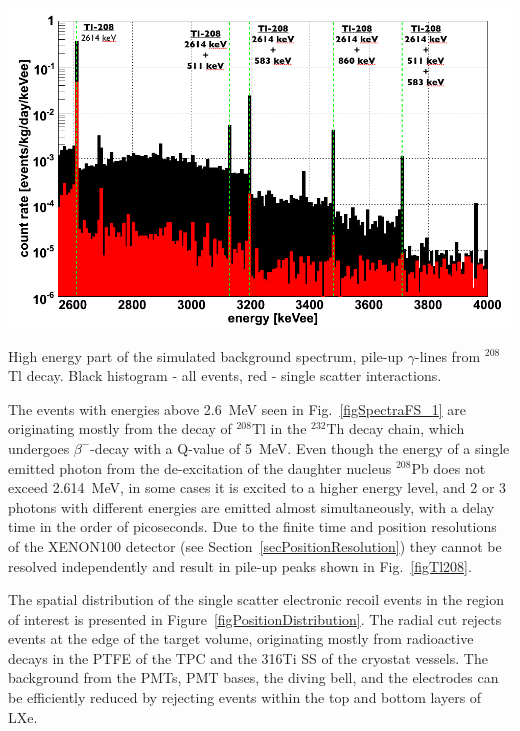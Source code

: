 \begin{floatingfigure}[lh]{0.475\textwidth}
\centering
\includegraphics[width=0.475\linewidth]{plots/BackgroundMaterials/Tl208decay.png}
\caption[High energy part of the simulated background spectrum, pile-up peaks from $^{208}$Tl decay]{High energy part of the simulated background spectrum, pile-up $\gamma$-lines from $^{208}$Tl decay. Black histogram - all events, red - single scatter interactions.}
\label{figTl208}
\end{floatingfigure}

The events with energies above 2.6~MeV seen in Fig.~\ref{figSpectraFS_1} are originating mostly from the decay of $^{208}$Tl in the $^{232}$Th decay chain, which undergoes $\beta^{-}$-decay with a Q-value of 5~MeV. Even though the energy of a single emitted photon from the de-excitation of the daughter nucleus $^{208}$Pb does not exceed 2.614~MeV, in some cases it is excited to a higher energy level, and 2 or 3 photons with different energies are emitted almost simultaneously, with a delay time in the order of picoseconds. Due to the finite time and position resolutions of the XENON100 detector (see Section~\ref{secPositionResolution}) they cannot be resolved independently and result in pile-up peaks shown in Fig.~\ref{figTl208}.

The spatial distribution of the single scatter electronic recoil events in the region of interest is presented in Figure~\ref{figPositionDistribution}. The radial cut rejects events at the edge of the target volume, originating mostly from radioactive decays in the PTFE of the TPC and the 316Ti SS of the cryostat vessels.
The background from the PMTs, PMT bases, the diving bell, and the electrodes can be efficiently reduced by rejecting events within the top and bottom layers of LXe.

